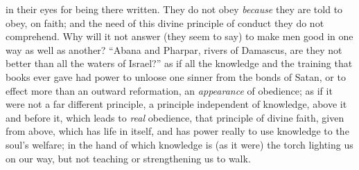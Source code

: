 in their eyes for being there written. They do not obey \emph{because}
they are told to obey, on faith; and the need of this
divine principle of conduct they do not comprehend. Why
will it not answer (they seem to say) to make men good in
one way as well as another? ``Abana and Pharpar,
rivers of Damascus, are they not better than all the
waters of Israel?'' as if all the knowledge and the
training that books ever gave had power to unloose one
sinner from the bonds of Satan, or to effect more than an
outward reformation, an \emph{appearance} of obedience;
as if it were not a far different principle, a principle
independent of knowledge, above it and before it, which
leads to \emph{real} obedience, that principle of
divine faith, given from above, which has life in itself,
and has power really to use knowledge to the soul's
welfare; in the hand of which knowledge is (as it were)
the torch lighting us on our way, but not teaching or
strengthening us to walk.

